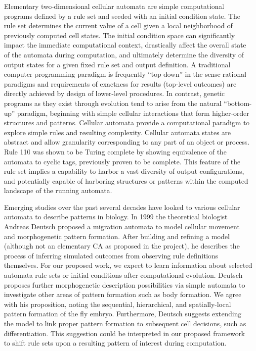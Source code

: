 \documentclass[twocolumn]{article}
\begin{document}
Elementary two-dimensional cellular automata are simple computational programs defined by a rule set and seeded with an initial condition state.  The rule set determines the current value of a cell given a local neighborhood of previously computed cell states.  The initial condition space can significantly impact the immediate computational context, drastically affect the overall state of the automata during computation, and ultimately determine the diversity of output states for a given fixed rule set and output definition.
A traditional computer programming paradigm is frequently ``top-down'' in the sense rational paradigms and requirements of exactness for results (top-level outcomes) are directly achieved by design of lower-level procedures.  In contrast, genetic programs as they exist through evolution tend to arise from the natural ``bottom-up'' paradigm, beginning with simple cellular interactions that form higher-order structures and patterns.
Cellular automata provide a computational paradigm to explore simple rules and resulting complexity.  Cellular automata states are abstract and allow granularity corresponding to any part of an object or process.  Rule 110 was shown \cite{Cook:2004tt} to be Turing complete by showing equivalence of the automata to cyclic tags, previously proven to be complete.  This feature of the rule set implies a capability to harbor a vast diversity of output configurations, and potentially capable of harboring structures or patterns within the computed landscape of the running automata.

Emerging studies over the past several decades have looked to various cellular automata to describe patterns in biology.  In 1999 the theoretical biologist Andreas Deutsch proposed a migration automata to model cellular movement and morphogenetic pattern formation. \cite{Deutsch:1999wh} After building and refining a model (although not an elementary CA as proposed in the project), he describes the process of inferring simulated outcomes from observing rule definitions themselves.  For our proposed work, we expect to learn information about selected automata rule sets or initial conditions after computational evolution.  Deutsch proposes further morphogenetic description possibilities via simple automata to investigate other areas of pattern formation such as body formation.  We agree with his proposition, noting the sequential, hierarchical, and spatially-local pattern formation of the fly embryo. \cite{Clyde:2003fy}  Furthermore, Deutsch suggests extending the model to link proper pattern formation to subsequent cell decisions, such as differentiation.  This suggestion could be interpreted in our proposed framework to shift rule sets upon a resulting pattern of interest during computation.
\end{document}
